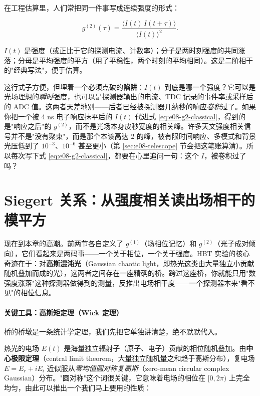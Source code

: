 在工程估算里，人们常把同一件事写成连续强度的形式：

\begin{equation}
  g^{(2)}(\tau)=\frac{\big\langle I(t)\,I(t+\tau)\big\rangle}{\big\langle I(t)\big\rangle^2}.
  \label{eq:e08-g2-classical}
\end{equation}
\begin{formulaexplain}
\(I(t)\) 是强度（或正比于它的探测电流、计数率）；分子是两时刻强度的共同涨落；分母是平均强度的平方（用了平稳性，两个时刻的平均相同）。这是二阶相干的"经典写法"，便于估算。
\end{formulaexplain}

这行式子方便，但埋着一个必须点破的\textbf{陷阱}：\(I(t)\) 到底是哪一个强度？它可以是光场理想的\emph{瞬时}强度，也可以是探测器输出的电流、TDC 记录的事件率或采样后的 ADC 值。这两者天差地别——后者已经被探测器几纳秒的响应\emph{卷积}过了。如果你把一个被 4 ns 电子响应抹平后的 \(I(t)\) 代进式 \eqref{eq:e08-g2-classical}，得到的是"响应之后"的 \(g^{(2)}\)，而不是光场本身皮秒宽度的相关峰。许多天文强度相关信号并不是"没有聚束"，而是那个本该高达 2 的峰，被有限时间响应、多模式和背景光压低到了 \(10^{-3}\)、\(10^{-6}\) 甚至更小（第 \ref{sec:e08-telescope} 节会把这笔账算清）。所以每次写下式 \eqref{eq:e08-g2-classical}，都要在心里追问一句：这个 \(I\)，被卷积过了吗？

\section{Siegert 关系：从强度相关读出场相干的模平方}
\label{sec:e08-siegert}

现在到本章的高潮。前两节各自定义了 \(g^{(1)}\)（场相位记忆）和 \(g^{(2)}\)（光子成对倾向），它们看起来是两码事——一个关于相位，一个关于强度。HBT 实验的核心奇迹在于：对\textbf{高斯混沌光}（Gaussian chaotic light，即热光这类由大量独立小贡献随机叠加而成的光），这两者之间存在一座精确的桥。跨过这座桥，你就能只用"数强度涨落"这种探测器做得到的测量，反推出电场相干度——一个探测器本来"看不见"的相位信息。

\paragraph{关键工具：高斯矩定理（Wick 定理）}
\label{sec:e08-gaussian-moment}

桥的桥墩是一条统计学定理，我们先把它单独讲清楚，绝不默默代入。

热光的电场 \(E(t)\) 是海量独立辐射子（原子、电子）贡献的相位随机叠加。由\textbf{中心极限定理}（central limit theorem，大量独立随机量之和趋于高斯分布），复电场 \(E=E_r+iE_i\) 近似服从\emph{零均值圆对称复高斯}（zero-mean circular complex Gaussian）分布。"圆对称"这个词很关键，它意味着电场的相位在 \([0,2\pi)\) 上完全均匀，由此可以推出一个我们马上要用的性质：

